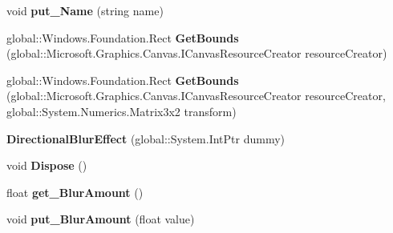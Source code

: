 \begin{DoxyCompactItemize}
void {\bfseries put\+\_\+\+Name} (string name)
\item 
\mbox{\label{class_microsoft_1_1_graphics_1_1_canvas_1_1_effects_1_1_directional_blur_effect_ad8347e784aa6e6582222d02840320dc2}} 
global\+::\+Windows.\+Foundation.\+Rect {\bfseries Get\+Bounds} (global\+::\+Microsoft.\+Graphics.\+Canvas.\+I\+Canvas\+Resource\+Creator resource\+Creator)
\item 
\mbox{\label{class_microsoft_1_1_graphics_1_1_canvas_1_1_effects_1_1_directional_blur_effect_a3137686f00a07e07d6981f2a8816c3c1}} 
global\+::\+Windows.\+Foundation.\+Rect {\bfseries Get\+Bounds} (global\+::\+Microsoft.\+Graphics.\+Canvas.\+I\+Canvas\+Resource\+Creator resource\+Creator, global\+::\+System.\+Numerics.\+Matrix3x2 transform)
\item 
\mbox{\label{class_microsoft_1_1_graphics_1_1_canvas_1_1_effects_1_1_directional_blur_effect_aca330745fdae8062acfb902b9cf55db1}} 
{\bfseries Directional\+Blur\+Effect} (global\+::\+System.\+Int\+Ptr dummy)
\item 
\mbox{\label{class_microsoft_1_1_graphics_1_1_canvas_1_1_effects_1_1_directional_blur_effect_aaa6e87737de12565ab452869f4ad7497}} 
void {\bfseries Dispose} ()
\item 
\mbox{\label{class_microsoft_1_1_graphics_1_1_canvas_1_1_effects_1_1_directional_blur_effect_a43208f48efee475569eb87fb59bc9afc}} 
float {\bfseries get\+\_\+\+Blur\+Amount} ()
\item 
\mbox{\label{class_microsoft_1_1_graphics_1_1_canvas_1_1_effects_1_1_directional_blur_effect_af6383dc92843270529d3fe1da82d3f22}} 
void {\bfseries put\+\_\+\+Blur\+Amount} (float value)
\item 
\mbox{\label{class_microsoft_1_1_graphics_1_1_canvas_1_1_effects_1_1_directional_blur_effect_a8bdc7eff811b34db9a82120142b52a62}} 

\end{DoxyCompactItemize}
